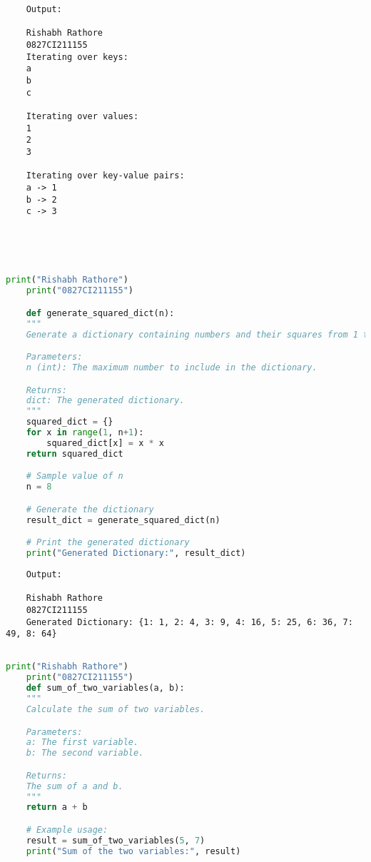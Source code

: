 \documentclass{report}
\begin{document}
\begin{verbatim}
	Output:

	Rishabh Rathore
	0827CI211155
	Iterating over keys:
	a
	b
	c
	
	Iterating over values:
	1
	2
	3
	
	Iterating over key-value pairs:
	a -> 1
	b -> 2
	c -> 3
	
	
	
	

\end{verbatim}


\newpage


\sol 
\begin{lstlisting}[language=Python]
	print("Rishabh Rathore")
	print("0827CI211155")

	def generate_squared_dict(n):
    """
    Generate a dictionary containing numbers and their squares from 1 to n.

    Parameters:
    n (int): The maximum number to include in the dictionary.

    Returns:
    dict: The generated dictionary.
    """
    squared_dict = {}
    for x in range(1, n+1):
        squared_dict[x] = x * x
    return squared_dict

	# Sample value of n
	n = 8

	# Generate the dictionary
	result_dict = generate_squared_dict(n)

	# Print the generated dictionary
	print("Generated Dictionary:", result_dict)

\end{lstlisting}

\begin{verbatim}
	Output:

	Rishabh Rathore
	0827CI211155
	Generated Dictionary: {1: 1, 2: 4, 3: 9, 4: 16, 5: 25, 6: 36, 7: 49, 8: 64}


\end{verbatim}


\newpage


\sol 
\begin{lstlisting}[language=Python]
	print("Rishabh Rathore")
	print("0827CI211155")
	def sum_of_two_variables(a, b):
    """
    Calculate the sum of two variables.

    Parameters:
    a: The first variable.
    b: The second variable.

    Returns:
    The sum of a and b.
    """
    return a + b

	# Example usage:
	result = sum_of_two_variables(5, 7)
	print("Sum of the two variables:", result)
  

\end{lstlisting}
\end{document}
